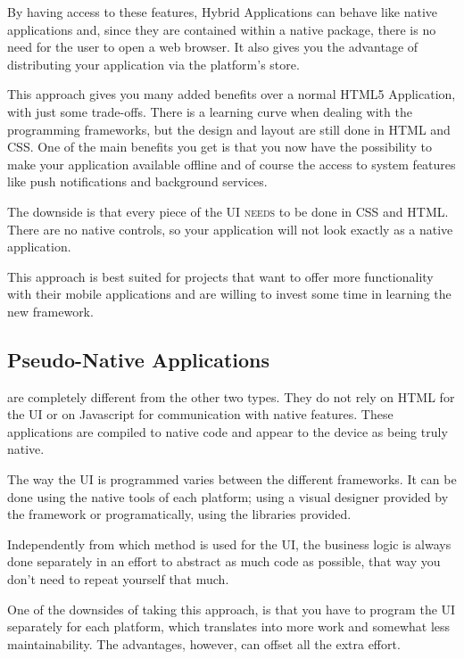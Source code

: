By having access to these features, Hybrid Applications can behave like native applications and, since they are contained within a native package, there is no need for the user to open a web browser. It also gives you the advantage of distributing your application via the platform's store.

This approach gives you many added benefits over a normal HTML5 Application, with just some trade-offs. There is a learning curve when dealing with the programming frameworks, but the design and layout are still done in HTML and CSS. One of the main benefits you get is that you now have the possibility to make your application available offline and of course the access to system features like push notifications and background services. 

The downside is that every piece of the \ac{UI} \textsc{needs} to be done in CSS and HTML. There are no native controls, so your application will not look exactly as a native application. 

This approach is best suited for projects that want to offer more functionality with their mobile applications and are willing to invest some time in learning the new framework.  

\subsection{Pseudo-Native Applications}\label{sec:pseudo_app}
 are completely different from the other two types. They do not rely on HTML for the \ac{UI} or on Javascript for communication with native features. These applications are compiled to native code and appear to the device as being truly native.


The way the \ac{UI} is programmed varies between the different frameworks. It can be done using the native tools of each platform; using a visual designer provided by the framework or programatically, using the libraries provided.

Independently from which method is used for the \ac{UI}, the business logic is always done separately in an effort to abstract as much code as possible, that way you don't need to repeat yourself that much.


One of the downsides of taking this approach, is that you have to program the \ac{UI} separately for each platform, which translates into more work and somewhat less maintainability. The advantages, however, can offset all the extra effort.


